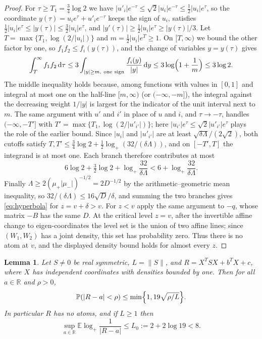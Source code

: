 \documentclass[11pt]{amsart}
\numberwithin{equation}{section}
\newtheorem{lemma}[theorem]{Lemma}
\theoremstyle{definition}
\theoremstyle{remark}
\newcommand{\R}{\mathbb R}
\newcommand{\E}{\mathbb E}
\newcommand{\PP}{\mathbb P}
\newcommand{\1}{\mathbf 1}
\newcommand{\dd}{\,\mathrm d}
\newcommand{\logp}{\log_+}
\newcommand{\norm}[1]{\lVert #1\rVert}
\newcommand{\abs}[1]{\lvert #1\rvert}
\begin{document}
\begin{proof}
For $\tau\ge T_1=\frac34\log2$ we have $\abs{u'_i}e^{-\tau}\le\sqrt2\abs{u_i}e^{-\tau}\le\frac12\abs{u_i}e^\tau$, so the coordinate $y(\tau)=u_ie^\tau+u'_ie^{-\tau}$ keeps the sign of $u_i$, satisfies $\frac12\abs{u_i}e^\tau\le\abs{y(\tau)}\le\frac32\abs{u_i}e^\tau$, and $\abs{y'(\tau)}\ge\frac12\abs{u_i}e^\tau\ge\abs{y(\tau)}/3$. Let $T=\max\{T_1,\log(2/\abs{u_i})\}$ and $m=\frac12\abs{u_i}e^T\ge1$. On $[T,\infty)$ we bound the other factor by one, so $f_1f_2\le f_i(y(\tau))$, and the change of variables $y=y(\tau)$ gives
\[
\int_T^\infty f_1f_2\dd\tau\le3\int_{\abs y\ge m,\ \mathrm{one\ sign}}\frac{f_i(y)}{\abs y}\dd y\le3\log\Bigl(1+\frac1m\Bigr)\le3\log2 .
\]
The middle inequality holds because, among functions with values in $[0,1]$ and integral at most one on the half-line $[m,\infty)$ (or $(-\infty,-m]$), the integral against the decreasing weight $1/\abs y$ is largest for the indicator of the unit interval next to $m$. The same argument with $u'$ and $i'$ in place of $u$ and $i$, and $\tau\to-\tau$, handles $(-\infty,-T']$ with $T'=\max\{T_1,\log(2/\abs{u'_{i'}})\}$; here $\abs{u_{i'}}e^{\tau}\le\sqrt2\abs{u'_{i'}}e^{\tau}$ plays the role of the earlier bound. Since $\abs{u_i}$ and $\abs{u'_{i'}}$ are at least $\sqrt{\delta\Lambda}/(2\sqrt2)$, both cutoffs satisfy $T,T'\le\frac34\log2+\frac12\logp(32/(\delta\Lambda))$, and on $[-T',T]$ the integrand is at most one. Each branch therefore contributes at most
\[
6\log2+\tfrac32\log2+\logp\frac{32}{\delta\Lambda}<6+\logp\frac{32}{\delta\Lambda}.
\]
Finally $\Lambda\ge2(\mu_+\abs{\mu_-})^{-1/2}=2D^{-1/2}$ by the arithmetic--geometric mean inequality, so $32/(\delta\Lambda)\le16\sqrt D/\delta$, and summing the two branches gives \eqref{eq:hyperbola} for $z=v+\delta>v$. For $z<v$ apply the same argument to $-q$, whose matrix $-B$ has the same $D$. At the critical level $z=v$, after the invertible affine change to eigen-coordinates the level set is the union of two affine lines; since $(W_1,W_2)$ has a joint density, this set has probability zero. Thus there is no atom at $v$, and the displayed density bound holds for almost every $z$.
\end{proof}

\begin{lemma}\label{lem:concentration}
Let $S\ne0$ be real symmetric, $L=\norm S$, and $R=X^TSX+b^TX+c$, where $X$ has independent coordinates with densities bounded by one. Then for all $a\in\R$ and $\rho>0$,
\begin{equation}\label{eq:concentration}
\PP(\abs{R-a}<\rho)\le\min\Bigl\{1,19\sqrt{\rho/L}\Bigr\}.
\end{equation}
In particular $R$ has no atoms, and if $L\ge1$ then
\begin{equation}\label{eq:logmoment}
\sup_{a\in\R}\E\logp\frac1{\abs{R-a}}\le L_0:=2+2\log19<8 .
\end{equation}
\end{lemma}
\end{document}
